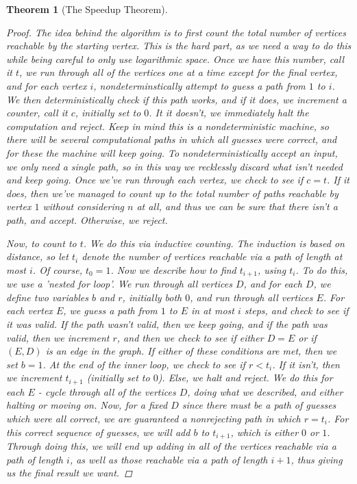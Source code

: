 \documentclass{article}
\theoremstyle{definition}
\theoremstyle{plain}
\theoremstyle{theorem}
\newtheorem{theorem}{Theorem}[section]
\begin{document}
\begin{theorem}[The Speedup Theorem]
\begin{proof}
    \par The idea behind the algorithm is to first count the total number of vertices reachable by the starting vertex. This is the hard part, as we need a way to do this while being careful to only use logarithmic space. Once we have this number, call it $t$, we run through all of the vertices one at a time \textit{except for} the final vertex, and for each vertex $i$, nondeterminstically attempt to guess a path from $1$ to $i$. We then deterministically check if this path works, and if it does, we increment a counter, call it $c$, initially set to $0$. It it doesn't, we immediately halt the computation and reject. Keep in mind this is a nondeterministic machine, so there will be several computational paths in which all guesses were correct, and for these the machine will keep going. To nondeterministically accept an input, we only need a single path, so in this way we recklessly discard what isn't needed and keep going. Once we've run through each vertex, we check to see if $c = t$. If it does, then we've managed to count up to the total number of paths reachable by vertex $1$ without considering $n$ at all, and thus we can be sure that there isn't a path, and accept. Otherwise, we reject. 
    \par Now, to count to $t$. We do this via inductive counting. The induction is based on distance, so let $t_i$ denote the number of vertices reachable via a path of length at most $i$. Of course, $t_0 = 1$. Now we describe how to find $t_{i+1}$, using $t_i$. To do this, we use a 'nested for loop'. We run through all vertices $D$, and for each $D$, we define two variables $b$ and $r$, initially both $0$, and run through all vertices $E$. For each vertex $E$, we guess a path from $1$ to $E$ in at most $i$ steps, and check to see if it was valid. If the path wasn't valid, then we keep going, and if the path was valid, then we increment $r$, and then we check to see if either $D = E$ or if $(E,D)$ is an edge in the graph. If either of these conditions are met, then we set $b=1$. At the end of the inner loop, we check to see if $r < t_i$. If it isn't, then we increment $t_{i+1}$ (initially set to $0$). Else, we halt and reject. We do this for each $E$ - cycle through all of the vertices $D$, doing what we described, and either halting or moving on. Now, for a fixed $D$ since there must be a path of guesses which were all correct, we are guaranteed a nonrejecting path in which $r = t_i$. For this correct sequence of guesses, we will add $b$ to $t_{i+1}$, which is either $0$ or $1$. Through doing this, we will end up adding in all of the vertices reachable via a path of length $i$, as well as those reachable via a path of length $i+1$, thus giving us the final result we want. 

\end{proof}
\end{theorem}
\end{document}
